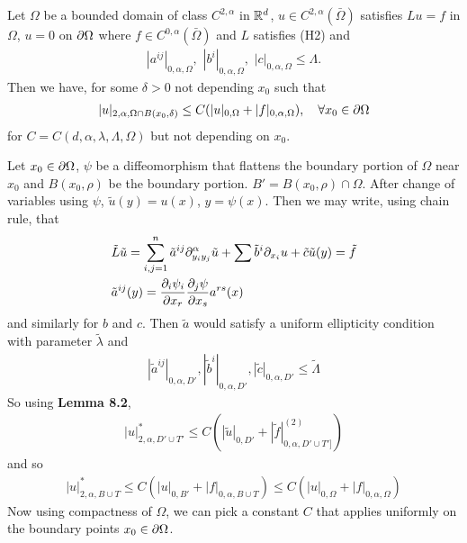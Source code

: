 \documentclass[12pt,a4paper]{article}
\newenvironment{proof}
{\begin{changemargin}{1cm}{0.5cm} 
	}%
	{\end{changemargin}
}
\newenvironment{p}
{\begin{proof} 
	}%
	{\end{proof}
}
\begin{document}
 Let $\Omega$ be a bounded domain of class $C^{2, \alpha}$ in $\mathbb{R}^d$, $u\in C^{2, \alpha}(\bar{\Omega})$ satisfies $Lu = f$ in $\Omega$, $u =0$ on $\partial \Omega$ where $f\in C^{0, \alpha}(\bar{\Omega})$ and $L$ satisfies (H2) and
\begin{align*}
|a^{ij}|_{0, \alpha, \Omega}, \,\, |b^{i}|_{0, \alpha, \Omega},\,\, |c|_{0, \alpha, \Omega} \leq \Lambda.
\end{align*}
Then we have, for some $\delta>0$ not depending $x_0$ such that
\begin{align*}
|u|_{2, \alpha, \Omega \cap B(x_0, \delta)} \leq C(|u|_{0, \Omega} + |f|_{0, \alpha, \Omega}), \quad \forall x_0 \in \partial \Omega
\end{align*} 
for $C = C(d, \alpha, \lambda, \Lambda, \Omega)$ but not depending on $x_0$.
\begin{p}
\pf Let $x_0 \in \partial \Omega$, $\psi$ be a diffeomorphism that flattens the boundary portion of $\Omega$ near $x_0$ and $B(x_0, \rho)$ be the boundary portion. $B' = B(x_0, \rho) \cap \Omega$. After change of variables using $\psi$, $\tilde{u}(y) = u(x)$, $y = \psi(x)$. Then we may write, using chain rule, that 
\begin{align*}
&\tilde{L}\tilde{u}= \sum_{i,j=1}^n \tilde{a}^{ij} \partial_{y_i y_j}^{\alpha} \tilde{u} + \sum \tilde{b}^i \partial_{x_i} u + \tilde{c}\tilde{u}(y) = \tilde{f} \\
&\tilde{a}^{ij}(y) = \frac{\partial_i \psi_i}{\partial x_r} \frac{\partial_j \psi}{\partial x_s} a^{rs}(x)
\end{align*}
and similarly for $b$ and $c$. Then $\tilde{a}$ would satisfy a uniform ellipticity condition with parameter $\tilde{\lambda}$ and
\begin{align*}
|\tilde{a}^{ij}|_{0, \alpha, D'}, |\tilde{b}^i|_{0, \alpha, D'}, |\tilde{c}|_{0, \alpha, D'}\leq \tilde{\Lambda} 
\end{align*}
So using \textbf{Lemma 8.2},
\begin{align*}
|u|^*_{2, \alpha, D' \cup T'} \leq C(|\tilde{u}|_{0, D'} + |\tilde{f}|^{(2)}_{0, \alpha, D' \cup T']})
\end{align*}
and so
\begin{align*}
|u|^*_{2,\alpha, B\cup T} \leq  C(|u|_{0, B'} + |f|_{0, \alpha, B\cup T}) \leq C(|u|_{0, \Omega}+ |f|_{0, \alpha, \Omega})
\end{align*}
Now using compactness of $\Omega$, we can pick a constant $C$ that applies uniformly on the boundary points $x_0 \in \partial \Omega$.
\s

\eop
\end{p}
\end{document}
